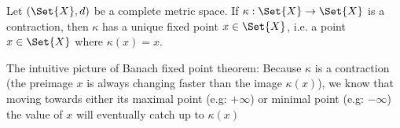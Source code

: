 
\begin{thm}
  Let $(\Set{X}, d)$ be a complete metric space. If $\kappa: \Set{X} \rightarrow \Set{X}$ is a contraction, then $\kappa$ has a unique fixed point $x \in \Set{X}$, i.e. a point $x \in \Set{X}$ where $\kappa(x) = x$.
\end{thm}

\begin{rem}
  The intuitive picture of Banach fixed point theorem: Because $\kappa$ is a contraction (the preimage $x$ is always changing faster than the image $\kappa(x)$), we know that moving towards either its maximal point (e.g: $+\infty$) or minimal point (e.g: $-\infty$) the value of $x$ will eventually catch up to $\kappa(x)$
\end{rem}

